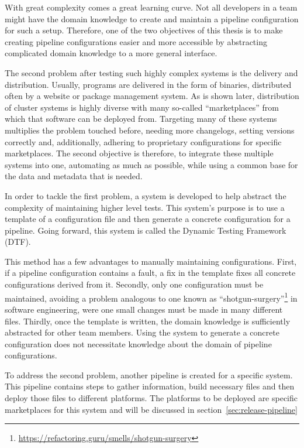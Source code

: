 With great complexity comes a great learning curve.
Not all developers in a team might have the domain knowledge to create and maintain a pipeline configuration for such a setup.
Therefore, one of the two objectives of this thesis is to make creating pipeline configurations easier and more accessible by abstracting complicated domain knowledge to a more general interface.

The second problem after testing such highly complex systems is the delivery and distribution.
Usually, programs are delivered in the form of binaries, distributed often by a website or package management system.
As is shown later, distribution of cluster systems is highly diverse with many so-called ``marketplaces'' from which that software can be deployed from.
Targeting many of these systems multiplies the problem touched before, needing more changelogs, setting versions correctly and, additionally, adhering to proprietary configurations for specific marketplaces.
The second objective is therefore, to integrate these multiple systems into one, automating as much as possible, while using a common base for the data and metadata that is needed.

In order to tackle the first problem, a system is developed to help abstract the complexity of maintaining higher level tests.
This system's purpose is to use a template of a configuration file and then generate a concrete configuration for a pipeline.
Going forward, this system is called the Dynamic Testing Framework (DTF).

This method has a few advantages to manually maintaining configurations.
First, if a pipeline configuration contains a fault, a fix in the template fixes all concrete configurations derived from it.
Secondly, only one configuration must be maintained, avoiding a problem analogous to one known as ``shotgun-surgery''\footnote{\url{https://refactoring.guru/smells/shotgun-surgery}} in software engineering, were one small changes must be made in many different files.
Thirdly, once the template is written, the domain knowledge is sufficiently abstracted for other team members.
Using the system to generate a concrete configuration does not necessitate knowledge about the domain of pipeline configurations.

To address the second problem, another pipeline is created for a specific system.
This pipeline contains steps to gather information, build necessary files and then deploy those files to different platforms.
The platforms to be deployed are specific marketplaces for this system and will be discussed in section~\ref{sec:release-pipeline}

